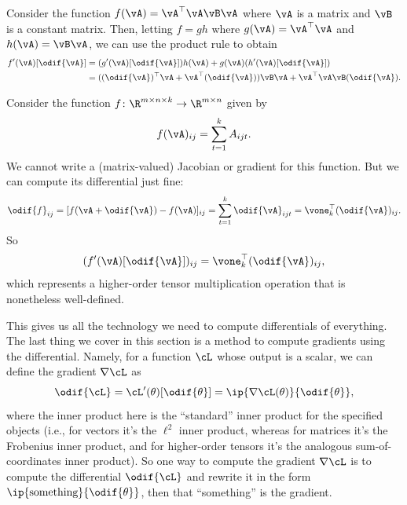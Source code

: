\documentclass[../../book-main.tex]{subfiles}
\begin{document}
\begin{example}
    Consider the function \(f(\vA) = \vA^{\top}\vA\vB\vA\) where \(\vA\) is a matrix and \(\vB\) is a constant matrix. Then, letting \(f = gh\) where \(g(\vA) = \vA^{\top}\vA\) and \(h(\vA) = \vB\vA\), we can use the product rule to obtain 
    \begin{align}
        f^{\prime}(\vA)[\odif{\vA}]
        &= (g^{\prime}(\vA)[\odif{\vA}])h(\vA) + g(\vA)(h^{\prime}(\vA)[\odif{\vA}]) \\
        &= ((\odif{\vA})^{\top}\vA + \vA^{\top}(\odif{\vA}))\vB\vA + \vA^{\top}\vA\vB(\odif{\vA}).
    \end{align}
\end{example}

\begin{example}
    Consider the function \(f \colon \R^{m \times n \times k} \to \R^{m \times n}\) given by 
    \begin{equation}
        f(\vA)_{ij} = \sum_{t = 1}^{k}A_{ijt}.
    \end{equation}
    We cannot write a (matrix-valued) Jacobian or gradient for this function. But we can compute its differential just fine:
    \begin{equation}
        \odif{f}_{ij} = [f(\vA + \odif{\vA}) - f(\vA)]_{ij} = \sum_{t = 1}^{k}\odif{\vA}_{ijt} = \vone_{k}^{\top}(\odif{\vA})_{ij}.
    \end{equation}
    So 
    \begin{equation}
        (f^{\prime}(\vA)[\odif{\vA}])_{ij} = \vone_{k}^{\top}(\odif{\vA})_{ij},
    \end{equation}
    which represents a higher-order tensor multiplication operation that is nonetheless well-defined.
\end{example}

This gives us all the technology we need to compute differentials of everything. The last thing we cover in this section is a method to compute gradients using the differential. Namely, for a function \(\cL\) whose output is a scalar, we can define the gradient \(\nabla \cL\) as 
\begin{equation}
    \odif{\cL} = \cL^{\prime}(\theta)[\odif{\theta}] = \ip{\nabla \cL(\theta)}{\odif{\theta}},
\end{equation}
where the inner product here is the ``standard'' inner product for the specified objects (i.e., for vectors it's the \(\ell^{2}\) inner product, whereas for matrices it's the Frobenius inner product, and for higher-order tensors it's the analogous sum-of-coordinates inner product). So one way to compute the gradient \(\nabla \cL\) is to compute the differential \(\odif{\cL}\) and rewrite it in the form \(\ip{\text{something}}{\odif{\theta}}\), then that ``something'' is the gradient.
\end{document}

